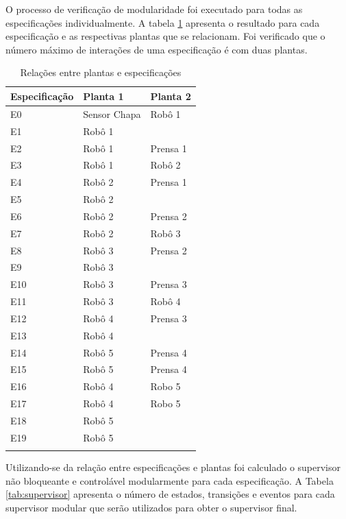 O processo de verificação de modularidade foi executado para todas as especificações individualmente. A tabela \ref{tab:modulos} apresenta o resultado para cada especificação e as respectivas plantas que se relacionam.
Foi verificado que o número máximo de interações de uma especificação é com duas plantas.

\begin{table}[h]%
\begin{center}
\begin{minipage}{0.5\textwidth}
\caption{Relações entre plantas e especificações}
\label{tab:modulos}
\begin{tabular}{@{}lll@{}}
  \toprule
  Especificação &  Planta 1 & Planta 2\\
  \midrule
  E0 & Sensor Chapa & Robô 1\\
  E1 & Robô 1 & \\
  E2 & Robô 1 & Prensa 1\\
  E3 & Robô 1 & Robô 2\\
  E4 & Robô 2 & Prensa 1\\
  E5 & Robô 2 & \\
  E6 & Robô 2 & Prensa 2\\
  E7 & Robô 2 & Robô 3\\
  E8 & Robô 3 & Prensa 2\\
  E9 & Robô 3 & \\
  E10 & Robô 3 & Prensa 3\\
  E11 & Robô 3 & Robô 4\\
  E12 & Robô 4 & Prensa 3\\
  E13 & Robô 4 & \\
  E14 & Robô 5 & Prensa 4\\
  E15 & Robô 5 & Prensa 4\\
  E16 & Robô 4 & Robo 5\\
  E17 & Robô 4 & Robo 5\\
  E18 & Robô 5 & \\
  E19 & Robô 5 & \\
  \botrule
\end{tabular}
\end{minipage}
\end{center}
\end{table}

\newpage

Utilizando-se da relação entre especificações e plantas foi calculado o supervisor não bloqueante e controlável modularmente para cada especificação.
A Tabela \ref{tab:supervisor} apresenta o número de estados, transições e eventos para cada supervisor modular que serão utilizados para obter o supervisor final.

